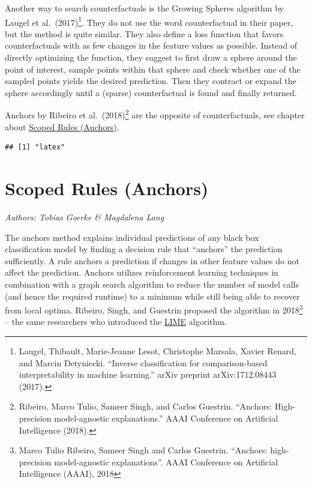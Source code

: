 \documentclass[
  11pt,
]{scrbook}
\begin{document}
Another way to search counterfactuals is the Growing Spheres algorithm by Laugel et al.~(2017)\footnote{Laugel, Thibault, Marie-Jeanne Lesot, Christophe Marsala, Xavier Renard, and Marcin Detyniecki. ``Inverse classification for comparison-based interpretability in machine learning.'' arXiv preprint arXiv:1712.08443 (2017).}.
They do not use the word counterfactual in their paper, but the method is quite similar.
They also define a loss function that favors counterfactuals with as few changes in the feature values as possible.
Instead of directly optimizing the function, they suggest to first draw a sphere around the point of interest, sample points within that sphere and check whether one of the sampled points yields the desired prediction.
Then they contract or expand the sphere accordingly until a (sparse) counterfactual is found and finally returned.

Anchors by Ribeiro et al.~(2018)\footnote{Ribeiro, Marco Tulio, Sameer Singh, and Carlos Guestrin. ``Anchors: High-precision model-agnostic explanations.'' AAAI Conference on Artificial Intelligence (2018).} are the opposite of counterfactuals, see chapter about \protect\hyperlink{anchors}{Scoped Rules (Anchors)}.

\begin{verbatim}
## [1] "latex"
\end{verbatim}

\newpage

\hypertarget{anchors}{%
\section{Scoped Rules (Anchors)}\label{anchors}}

\emph{Authors: Tobias Goerke \& Magdalena Lang}

The anchors method explains individual predictions of any black box classification model by finding a decision rule that ``anchors'' the prediction sufficiently.
A rule anchors a prediction if changes in other feature values do not affect the prediction.
Anchors utilizes reinforcement learning techniques in combination with a graph search algorithm to reduce the number of model calls (and hence the required runtime) to a minimum while still being able to recover from local optima. Ribeiro, Singh, and Guestrin proposed the algorithm in 2018\footnote{Marco Tulio Ribeiro, Sameer Singh and Carlos Guestrin. ``Anchors: high-precision model-agnostic explanations''. AAAI Conference on Artificial Intelligence (AAAI), 2018} -- the same researchers who introduced the \protect\hyperlink{lime}{LIME} algorithm.
\end{document}
